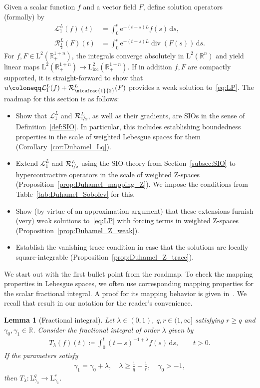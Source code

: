 \documentclass[11pt, leqno]{amsart}
\newtheorem{lemma}[theorem]{Lemma}
\theoremstyle{definition}
\newcommand{\R}{\mathbb{R}}
\renewcommand{\L}{\mathrm{L}}
\newcommand{\Z}{\mathrm{Z}}
\newcommand{\Sol}{\mathcal{R}}
\newcommand{\Soll}{\mathcal{L}}
\newcommand{\e}{\mathrm{e}}
\renewcommand{\d}{\,\mathrm{d}}
\DeclareMathOperator{\Div}{div}
\newcommand{\loc}{\mathrm{loc}}
\begin{document}
	Given a scalar function $f$ and a vector field $F$, define solution operators (formally) by
	\begin{align}
		\Soll^L_1(f)(t) &= \int_0^t \e^{-(t-s)L} f(s) \d s, \\
		\Sol^L_\frac{1}{2}(F)(t) &= \int_0^t \e^{-(t-s)L} \Div(F(s)) \d s.
	\end{align}
	For $f,F \in \L^2(\R^{1+n}_+)$, the integrals converge absolutely in $\L^2(\R^n)$ and yield linear maps $\L^2(\R^{1+n}_+) \to \L^2_\loc(\R^{1+n}_+)$. If in addition $f,F$ are compactly supported, it is straight-forward to show that $u \coloneqq \Soll^L_1(f) + \Sol^L_{\nicefrac{1}{2}}(F)$ provides a weak solution to~\eqref{eq:LP}. The roadmap for this section is as follows:
	\begin{itemize}
		\item Show that $\Soll^L_1$ and $\Sol^L_{\nicefrac{1}{2}}$, as well as their gradients, are SIOs in the sense of Definition~\ref{def:SIO}. In particular, this includes establishing boundedness properties in the scale of weighted Lebesgue spaces for them (Corollary~\ref{cor:Duhamel_Lq}).
		\item Extend $\Soll^L_1$ and $\Sol^L_{\nicefrac{1}{2}}$ using the SIO-theory from Section~\ref{subsec:SIO} to hypercontractive operators in the scale of weighted $\Z$-spaces (Proposition~\ref{prop:Duhamel_mapping_Z}). We impose the conditions from Table~\ref{tab:Duhamel_Sobolev} for this.
		\item Show (by virtue of an approximation argument) that these extensions furnish (very) weak solutions to~\eqref{eq:LP} with forcing terms in weighted $\Z$-spaces (Proposition~\ref{prop:Duhamel_Z_weak}).
		\item Establish the vanishing trace condition in case that the solutions are locally square-integrable (Proposition~\ref{prop:Duhamel_Z_trace}).
	\end{itemize}

	We start out with the first bullet point from the roadmap. To check the mapping properties in Lebesgue spaces, we often use corresponding mapping properties for the scalar fractional integral. A proof for its mapping behavior is given in~\cite[Thm.~3.7, p.~72]{Samko}. We recall that result in our notation for the reader's convenience.

	\begin{lemma}[Fractional integral]
		\label{lem:fractional_integral}
		Let $\lambda \in (0,1)$, $q,r \in (1,\infty]$ satisfying $r \geq q$ and $\gamma_0, \gamma_1 \in \R$. Consider the fractional integral of order $\lambda$ given by
		\begin{align}
			T_\lambda(f)(t) \coloneqq \int_0^t (t-s)^{-1+\lambda} f(s) \d s, \qquad t>0.
		\end{align}
		If the parameters satisfy
		\begin{align}
			\gamma_1 = \gamma_0 + \lambda, \quad \lambda \geq \frac{1}{q} - \frac{1}{r}, \quad \gamma_0 > -1,
		\end{align}
		then $T_\lambda \colon \L^q_{\gamma_0} \to \L^r_{\gamma_1}$.
	\end{lemma}
\end{document}
